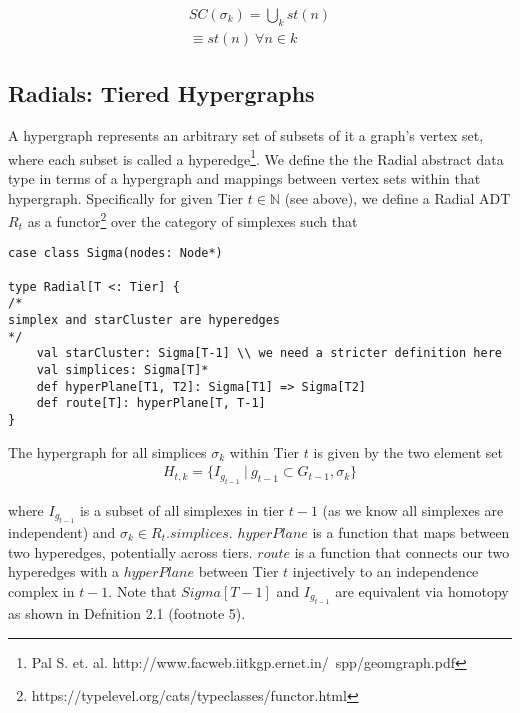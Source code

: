 \documentclass{article}
\begin{document}
\begin{equation} \label{eq1}
\begin{split}
SC(\sigma_k) = \bigcup_k st(n) \\
\equiv st(n) \ \forall n \in k
\end{split}
\end{equation}

\subsection{Radials: Tiered Hypergraphs}
A hypergraph represents an arbitrary set of subsets of it a graph's vertex set, where each subset is called a hyperedge\footnote{Pal S. et. al. http://www.facweb.iitkgp.ernet.in/~spp/geomgraph.pdf}. We define the the Radial abstract data type in terms of a hypergraph and mappings between vertex sets within that hypergraph. Specifically for given Tier $t \in \mathbb{N}$ (see above), we define a Radial ADT $R_t$ as a functor\footnote{https://typelevel.org/cats/typeclasses/functor.html} over the category of simplexes such that

\begin{lstlisting}
case class Sigma(nodes: Node*)

type Radial[T <: Tier] {
/*
simplex and starCluster are hyperedges
*/
	val starCluster: Sigma[T-1] \\ we need a stricter definition here
	val simplices: Sigma[T]*
	def hyperPlane[T1, T2]: Sigma[T1] => Sigma[T2]
	def route[T]: hyperPlane[T, T-1]
}
\end{lstlisting}

The hypergraph for all simplices $\sigma_k$ within Tier $t$ is given by the two element set
\begin{equation} \label{eq1}
\begin{split}
H_{t,k} = \{I_{g_{t-1}} \ | \ g_{t-1} \subset G_{t-1}, \sigma_k \}
\end{split}
\end{equation}

where $I_{g_{t-1}}$ is a subset of all simplexes in tier $t-1$ (as we know all simplexes are independent) and $\sigma_k \in R_t.simplices$. $hyperPlane$ is a function that maps between two hyperedges, potentially across tiers. $route$ is a function that connects our two hyperedges with a $hyperPlane$ between Tier $t$ injectively to an independence complex in $t-1$. Note that $Sigma[T-1]$ and $I_{g_{t-1}}$ are equivalent via homotopy as shown in Defnition 2.1 (footnote 5). 
\end{document}
